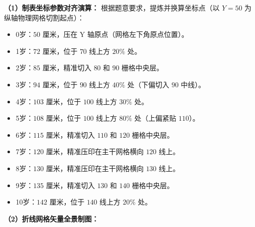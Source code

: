 \textbf{（1）制表坐标参数对齐演算：}
根据题意要求，提炼并换算坐标点（以 $Y=50$ 为纵轴物理网格切割起点）：
\begin{itemize}
    \item 0岁：$50$ 厘米，压在 Y 轴原点（网格左下角原点位置）。
    \item 1岁：$72$ 厘米，位于 $70$ 线上方 $20\%$ 处。
    \item 2岁：$85$ 厘米，精准切入 $80$ 和 $90$ 栅格中央层。
    \item 3岁：$94$ 厘米，位于 $90$ 线上方 $40\%$ 处（下偏切入 $90$ 中线）。
    \item 4岁：$103$ 厘米，位于 $100$ 线上方 $30\%$ 处。
    \item 5岁：$108$ 厘米，位于 $100$ 线上方 $80\%$ 处（上偏紧贴 $110$）。
    \item 6岁：$115$ 厘米，精准切入 $110$ 和 $120$ 栅格中央层。
    \item 7岁：$120$ 厘米，精准压印在主干网格横向 $120$ 线上。
    \item 8岁：$130$ 厘米，精准压印在主干网格横向 $130$ 线上。
    \item 9岁：$135$ 厘米，精准切入 $130$ 和 $140$ 栅格中央层。
    \item 10岁：$142$ 厘米，位于 $140$ 线上方 $20\%$ 处。
\end{itemize}

\textbf{（2）折线网格矢量全景制图：}

